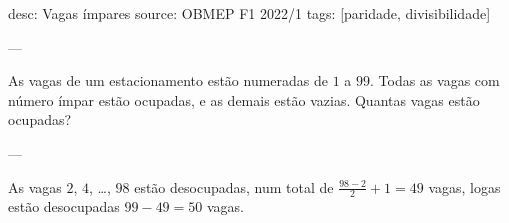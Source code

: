 desc:  Vagas ímpares
source:  OBMEP F1 2022/1
tags:  [paridade, divisibilidade]

---

As vagas de um estacionamento estão numeradas de $1$ a $99$. Todas as vagas com número ímpar estão ocupadas, e as demais estão vazias. Quantas vagas estão ocupadas?

---

As vagas $2$, $4$, \dots, $98$ estão desocupadas, num total de $\frac{98 - 2}{2} + 1 = 49$ vagas, logas estão desocupadas $99 - 49 = 50$ vagas.
